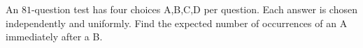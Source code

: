 An $81$-question test has four choices A,B,C,D per question. Each answer is chosen independently and uniformly. Find the expected number of occurrences of an A immediately after a B.
